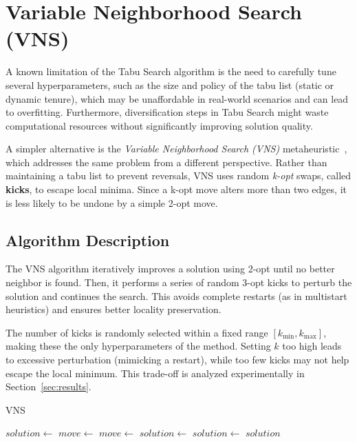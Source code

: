 \clearpage

\section{Variable Neighborhood Search (VNS)}

A known limitation of the Tabu Search algorithm is the need to carefully tune several hyperparameters, such as the size and policy 
of the tabu list (static or dynamic tenure), which may be unaffordable in real-world scenarios and can lead to overfitting. 
Furthermore, diversification steps in Tabu Search might waste computational resources without significantly improving solution quality.

A simpler alternative is the \textit{Variable Neighborhood Search (VNS)} metaheuristic~\cite{Hansen2009}, 
which addresses the same problem from a different perspective. Rather than maintaining a tabu list to prevent reversals, 
VNS uses random \textit{k-opt} swaps, called \textbf{kicks}, to escape local minima. Since a k-opt move alters more than two edges, 
it is less likely to be undone by a simple 2-opt move.

\subsection{Algorithm Description}

The VNS algorithm iteratively improves a solution using 2-opt until no better neighbor is found. Then, it performs a series of random 3-opt kicks 
to perturb the solution and continues the search. This avoids complete restarts (as in multistart heuristics) and ensures better locality preservation.

The number of kicks is randomly selected within a fixed range $[k_{\text{min}}, k_{\text{max}}]$, making these the only hyperparameters of the method. 
Setting $k$ too high leads to excessive perturbation (mimicking a restart), while too few kicks may not help escape the local minimum. 
This trade-off is analyzed experimentally in Section~\ref{sec:results}.

\begin{algorithm}
\caption{VNS}
\label{alg:vns}
\begin{algorithmic}
    \State $solution \gets$ 
        \State $move \gets$ 
                \State $move \gets$ 
                \State $solution \gets$ 
            \EndFor
        \Else
            \State $solution \gets$ 
        \EndIf
    \EndWhile
    \State \Return $solution$
\EndProcedure
\end{algorithmic}
\end{algorithm}

